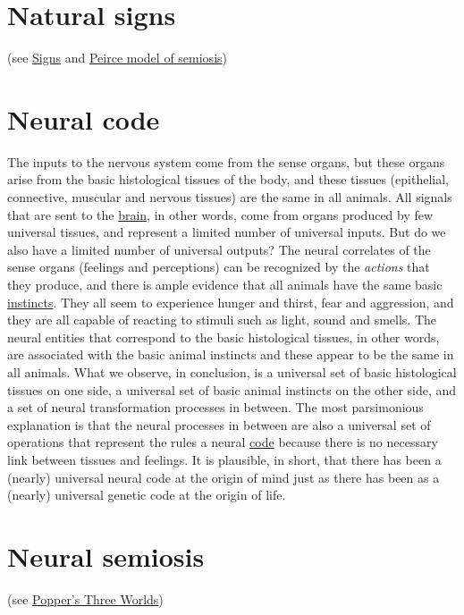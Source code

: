 \documentclass[12pt]{article}
\begin{document}
\hypertarget{natural_signs}{}
\section{Natural signs} 

(see \hyperlink{signs}{Signs} and \hyperlink{peirce_model_of_semiosis}{Peirce model of semiosis}) 


\hypertarget{neural_code}{}
\section{Neural code}
The inputs to the nervous system come from the sense organs, but these organs arise from the basic histological tissues of the body, and these tissues (epithelial, connective, muscular and nervous tissues) are the same in all animals. All signals that are sent to the \hyperlink{brain}{brain}, in other words, come from organs produced by few universal tissues, and represent a limited number of universal inputs. But do we also have a limited number of universal outputs? The neural correlates of the sense organs (feelings and perceptions) can be recognized by the \textit{actions} that they produce, and there is ample evidence that all animals have the same basic \hyperlink{instinctive_brain}{instincts}. They all seem to experience hunger and thirst, fear and aggression, and they are all capable of reacting to stimuli such as light, sound and smells. The neural entities that correspond to the basic histological tissues, in other words, are associated with the basic animal instincts and these appear to be the same in all animals. What we observe, in conclusion, is a universal set of basic histological tissues on one side, a universal set of basic animal instincts on the other side, and a set of neural transformation processes in between. The most parsimonious explanation is that the neural processes in between are also a universal set of operations that represent the rules a neural \hyperlink{code}{code} because there is no necessary link between tissues and feelings. It is plausible, in short, that there has been a (nearly) universal neural code at the origin of mind just as there has been as a (nearly) universal genetic code at the origin of life. 


\hypertarget{neural_semiosis}{}
\section{Neural semiosis} (see \hyperlink{poppers_three_worlds}{Popper's Three Worlds})
\end{document}
